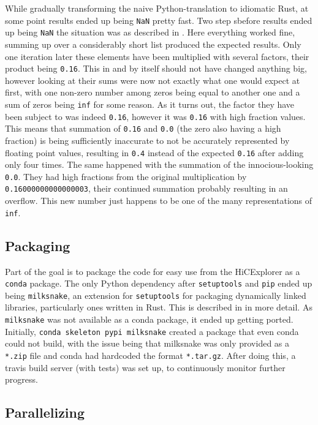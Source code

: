 While gradually transforming the naive Python-translation to idiomatic Rust, at
some point results ended up being \verb|NaN| pretty fast. Two step sbefore
results ended up being \verb|NaN| the situation was as described in
. Here everything worked fine, summing up over a considerably
short list produced the expected results. Only one iteration later these
elements have been multiplied with several factors, their product being
\verb|0.16|. This in and by itself should not have changed anything big,
however looking at  their sums were now not exactly what one
would expect at first, with one non-zero number among zeros being equal to
another one and a sum of zeros being \verb|inf| for some reason. As it turns
out, the factor they have been subject to was indeed \verb|0.16|, however it
was \verb|0.16| with high fraction values. This means that summation of
\verb|0.16| and \verb|0.0| (the zero also having a high fraction) is being
sufficiently inaccurate to not be accurately represented by floating point
values, resulting in \verb|0.4| instead of the expected \verb|0.16| after
adding only four times. The same happened with the summation of the
innocious-looking \verb|0.0|. They had high fractions from the original
multiplication by \verb|0.16000000000000003|, their continued summation
probably resulting in an overflow. This new number just happens to be one of
the many representations of \verb|inf|.


\subsection{Packaging}


Part of the goal is to package the code for easy use from the HiCExplorer as a
\verb|conda| package. The only Python dependency after \verb|setuptools| and
\verb|pip| ended up being \verb|milksnake|, an extension for \verb|setuptools|
for packaging dynamically linked libraries, particularly ones written in Rust.
This is described in  in more detail. As
\verb|milksnake| was not available as a conda package, it ended up getting
ported. Initially, \verb|conda skeleton pypi milksnake| created a package that
even conda could not build, with the issue being that milksnake was only
provided as a \verb|*.zip| file and conda had hardcoded the format
\verb|*.tar.gz|. After doing this, a travis build server (with tests) was set
up, to continuously monitor further progress.


\subsection{Parallelizing}

